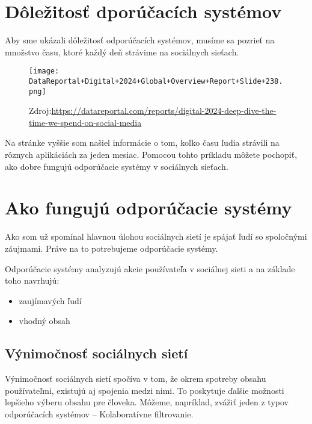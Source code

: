 \documentclass[10pt,twoside,slovak,a4paper]{article}
\begin{document}
\section{Dôležitosť dporúčacích systémov}

Aby sme ukázali dôležitosť odporúčacích systémov, musíme sa pozrieť na množstvo času, ktoré každý deň strávime na sociálnych sieťach.

\begin{figure}[h]
    \centering
    \texttt{[image: DataReportal+Digital+2024+Global+Overview+Report+Slide+238.png]}
    \caption{Zdroj:\url{https://datareportal.com/reports/digital-2024-deep-dive-the-time-we-spend-on-social-media}}
    \label{fig:enter-label}
\end{figure}

Na stránke vyššie som našiel informácie o tom, koľko času ľudia strávili na rôznych aplikáciách za jeden mesiac. Pomocou tohto príkladu môžete pochopiť, ako dobre fungujú odporúčacie systémy v sociálnych sieťach.








\section{Ako fungujú odporúčacie systémy}

Ako som už spomínal hlavnou úlohou sociálnych sietí je spájať ľudí so spoločnými záujmami. Práve na to potrebujeme odporúčacie systémy.

Odporúčacie systémy analyzujú akcie používateľa v sociálnej sieti a na základe toho navrhujú:

\begin{itemize}
\item zaujímavých ľudí
\item vhodný obsah
\end{itemize}





\subsection{Výnimočnosť sociálnych sietí}

Výnimočnosť sociálnych sietí spočíva v tom, že okrem spotreby obsahu používateľmi, existujú aj spojenia medzi nimi. To poskytuje ďalšie možnosti lepšieho výberu obsahu pre človeka. Môžeme, napríklad, zvážiť jeden z typov odporúčacích systémov – Kolaboratívne filtrovanie.
\end{document}
